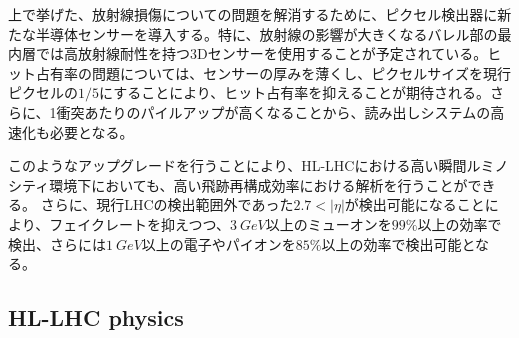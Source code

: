 上で挙げた、放射線損傷についての問題を解消するために、ピクセル検出器に新たな半導体センサーを導入する。特に、放射線の影響が大きくなるバレル部の最内層では高放射線耐性を持つ3Dセンサーを使用することが予定されている。ヒット占有率の問題については、センサーの厚みを薄くし、ピクセルサイズを現行ピクセルの$1/5$にすることにより、ヒット占有率を抑えることが期待される。さらに、1衝突あたりのパイルアップが高くなることから、読み出しシステムの高速化も必要となる。


このようなアップグレードを行うことにより、HL-LHCにおける高い瞬間ルミノシティ環境下においても、高い飛跡再構成効率における解析を行うことができる。
さらに、現行LHCの検出範囲外であった$2.7<|\eta|$が検出可能になることにより、フェイクレートを抑えつつ、$3\ \si{GeV}$以上のミューオンを$99\si{\%}$以上の効率で検出、さらには$1\ \si{GeV}$以上の電子やパイオンを$85\si{\%}$以上の効率で検出可能となる。



\subsection{HL-LHC physics}
\label{sec:hl-lhc-physics}





\newpage
